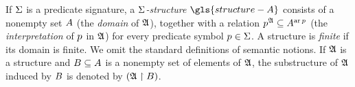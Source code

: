 
If $\mathrm{\Sigma}$ is a predicate signature, a \emph{$\mathrm{\Sigma}$-structure}
$\gls{structure-A}$ consists of a nonempty set $A$ (the \emph{domain} of
$\mathfrak{A}$), together with a relation $p^{\mathfrak{A}} \subseteq A^{\operatorname{ar}p}$ (the
\emph{interpretation} of $p$ in $\mathfrak{A}$) for every predicate symbol $p
\in \mathrm{\Sigma}$. A structure is \emph{finite} if its domain is finite.
We omit the standard definitions of semantic notions.
If $\mathfrak{A}$ is a structure and $B \subseteq A$ is a nonempty set of
elements of $\mathfrak{A}$, the substructure of $\mathfrak{A}$ induced by $B$ is denoted
by $(\mathfrak{A} \restriction B)$.